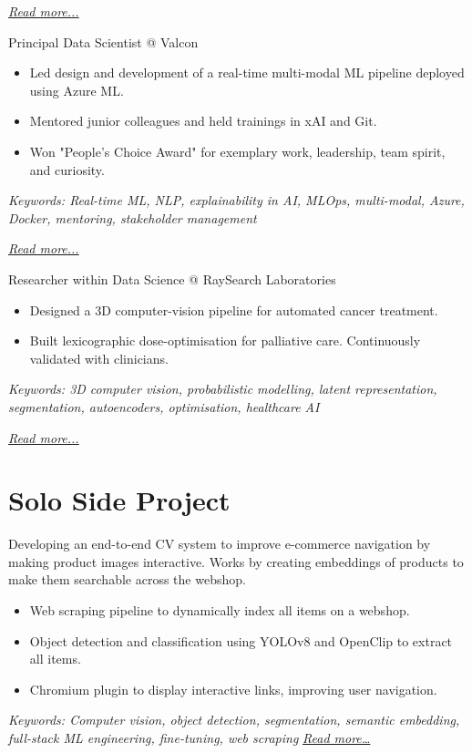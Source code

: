 \documentclass[11pt,a4paper]{moderncv}
\begin{document}
\hfill{\small{\textit{\hyperref[sec:signum]{Read more...}}}}

\large{Principal Data Scientist @ Valcon}
\normalsize
\begin{itemize}
    \item Led design and development of a real-time multi-modal ML pipeline deployed using Azure ML.
    \item Mentored junior colleagues and held trainings in xAI and Git.
    \item Won "People's Choice Award" for exemplary work, leadership, team spirit, and curiosity.
\end{itemize}

{\footnotesize\textit{Keywords: Real-time ML, NLP, explainability in AI, MLOps, multi-modal, Azure, Docker, mentoring, stakeholder management}}

\hfill{\small{\textit{\hyperref[sec:valcon]{Read more...}}}}

\large{Researcher within Data Science @ RaySearch Laboratories}
\normalsize
\begin{itemize}
    \item Designed a 3D computer-vision pipeline for automated cancer treatment.
    \item Built lexicographic dose-optimisation for palliative care. Continuously validated with clinicians.
\end{itemize}

{\footnotesize\textit{Keywords: 3D computer vision, probabilistic modelling, latent representation, segmentation, autoencoders, optimisation, healthcare AI}}

\hfill{\small{\textit{\hyperref[sec:raysearch]{Read more...}}}}

\section{Solo Side Project}
\normalsize
Developing an end-to-end CV system to improve e-commerce navigation by making product images interactive. Works by creating embeddings of products to make them searchable across the webshop.
\begin{itemize}
  \item Web scraping pipeline to dynamically index all items on a webshop.
  \item Object detection and classification using YOLOv8 and OpenClip to extract all items.
  \item Chromium plugin to display interactive links, improving user navigation.
\end{itemize}
{\footnotesize\textit{Keywords: Computer vision, object detection, segmentation, semantic embedding, full-stack ML engineering, fine-tuning, web scraping}}
\hfill{\small{\textit{\hyperref[sec:iris]{Read more…}}}}
\end{document}
